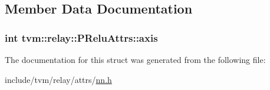 \subsection{Member Data Documentation}
\subsubsection[{\texorpdfstring{axis}{axis}}]{\setlength{\rightskip}{0pt plus 5cm}int tvm\+::relay\+::\+P\+Relu\+Attrs\+::axis}\hypertarget{structtvm_1_1relay_1_1PReluAttrs_a754f4d5b74e0662ad598781f105bc3b7}{}\label{structtvm_1_1relay_1_1PReluAttrs_a754f4d5b74e0662ad598781f105bc3b7}


The documentation for this struct was generated from the following file\+:\begin{DoxyCompactItemize}
\item 
include/tvm/relay/attrs/\hyperlink{include_2tvm_2relay_2attrs_2nn_8h}{nn.\+h}\end{DoxyCompactItemize}
